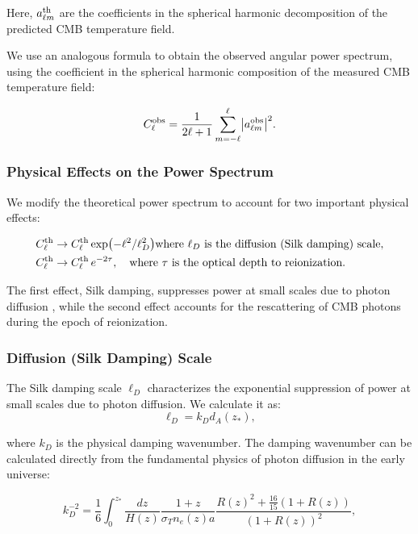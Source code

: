\documentclass[11pt]{article}
\theoremstyle{definition}
\begin{document}
Here, $a_{\ell m}^{\rm th}$ are the coefficients in the spherical harmonic decomposition of the predicted CMB temperature field.

We use an analogous formula to obtain the observed angular power spectrum, using the coefficient in the spherical harmonic composition of the measured CMB temperature field:

\begin{equation}
  C_\ell^{\rm obs}
  = \frac{1}{2\ell+1}\sum_{m=-\ell}^{\ell}\bigl|a_{\ell m}^{\rm obs}\bigr|^2.
\end{equation}

\subsubsection{Physical Effects on the Power Spectrum}
We modify the theoretical power spectrum to account for two important physical effects:

\begin{align}
  &C_\ell^{\rm th} \to C_\ell^{\rm th}  \exp\bigl(-\ell^2/\ell_D^2\bigr)
  \text{where }\ell_D\text{ is the diffusion (Silk damping) scale},\\
  &C_\ell^{\rm th}\to C_\ell^{\rm th}\,e^{-2\tau},
  \quad
  \text{where }\tau\text{ is the optical depth to reionization}.
\end{align}

The first effect, Silk damping, suppresses power at small scales due to photon diffusion \cite{silk1968}, while the second effect accounts for the rescattering of CMB photons during the epoch of reionization.

\subsubsection{Diffusion (Silk Damping) Scale}
The Silk damping scale $\ell_D$ characterizes the exponential suppression of power at small scales due to photon diffusion. We calculate it as:
\begin{equation}
\ell_D = k_D d_A(z_*),
\end{equation}

  where $k_D$ is the physical damping wavenumber. The damping wavenumber can be calculated directly from the fundamental physics of photon diffusion in the early universe:

\begin{equation}
k_D^{-2} = \frac{1}{6} \int_{0}^{z_*} \frac{dz}{H(z)} \frac{1+z}{\sigma_T n_e(z) a} \frac{{R(z)}^2 + \frac{16}{15}(1+R(z))}{(1+R(z))^2},
\end{equation}
\end{document}
